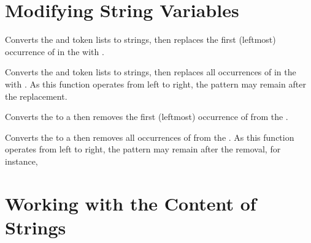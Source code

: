 \documentclass[oneside]{book}
\begin{document}
\section{Modifying String Variables}

\begin{function}{\StrVarReplaceOnce}
\begin{syntax}
   
\end{syntax}
Converts the  and  token lists to strings, then
replaces the first (leftmost) occurrence of  in the
 with .
\end{function}

\begin{function}{\StrVarReplaceAll}
\begin{syntax}
   
\end{syntax}
Converts the  and  token lists to strings, then
replaces all occurrences of  in the
 with .
As this function
operates from left to right, the pattern 
may remain after the replacement.
\end{function}

\begin{function}{\StrVarRemoveOnce}
\begin{syntax}
  
\end{syntax}
Converts the  to a  then
removes the first (leftmost) occurrence of  from the
.
\end{function}

\begin{function}{\StrVarRemoveAll}
\begin{syntax}
  
\end{syntax}
Converts the  to a  then
removes all occurrences of  from the .
As this function operates from left to right,
the pattern  may remain after the removal, for instance,
\begin{demohigh}
\StrSet {}
\StrVarRemoveAll {}
\TlUse \lTmpaStr
\end{demohigh}
\end{function}

\section{Working with the Content of Strings}
\end{document}
